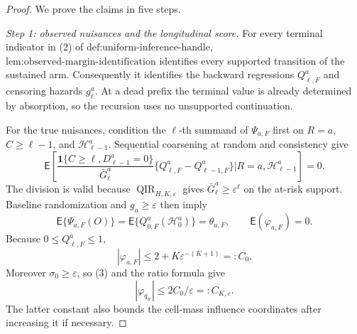 \documentclass{article}
\begin{document}
\begin{proof}
We prove the claims in five steps.

\emph{Step 1: observed nuisances and the longitudinal score.}
For every terminal indicator in (2) of \(\text{def:uniform-inference-handle}\), \(\text{lem:observed-margin-identification}\) identifies every supported transition of the sustained arm.  Consequently it identifies the backward regressions \(Q_{\ell,F}^a\) and censoring hazards \(g_\ell^a\).  At a dead prefix the terminal value is already determined by absorption, so the recursion uses no unsupported continuation.

For the true nuisances, condition the \(\ell\)-th summand of \(\Psi_{a,F}\) first on \(R=a\), \(C\ge\ell-1\), and \(\mathcal H_{\ell-1}^a\).  Sequential coarsening at random and consistency give
\[
 \mathsf E\!\left[
 \frac{\mathbf 1\{C\ge\ell,D_{\ell-1}^a=0\}}{\bar G_\ell^a}
 \{Q_{\ell,F}^a-Q_{\ell-1,F}^a\}
 \mathrel{\Big|} R=a,\mathcal H_{\ell-1}^a\right]=0.       \tag{1}
\]
The division is valid because \(\operatorname{QIR}_{H,K,\varepsilon}\) gives \(\bar G_\ell^a\ge\varepsilon^\ell\) on the at-risk support.  Baseline randomization and \(g_a\ge\varepsilon\) then imply
\[
 \mathsf E\{\Psi_{a,F}(O)\}=\mathsf E\{Q_{0,F}^a(\mathcal H_0^a)\}=\theta_{a,F},
 \qquad \mathsf E(\varphi_{a,F})=0.                       \tag{2}
\]
Because \(0\le Q_{\ell,F}^a\le1\),
\[
 |\varphi_{a,F}|
 \le 2+K\varepsilon^{-(K+1)}=:C_0.                       \tag{3}
\]
Moreover \(\sigma_0\ge\varepsilon\), so (3) and the ratio formula give
\[
 |\varphi_{q_w}|\le 2C_0/\varepsilon=:C_{K,\varepsilon}. \tag{4}
\]
The latter constant also bounds the cell-mass influence coordinates after increasing it if necessary.


\end{proof}
\end{document}
